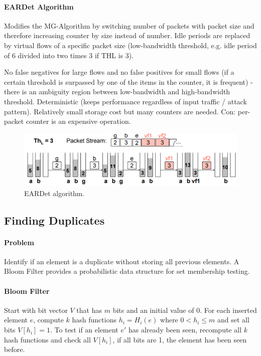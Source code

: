\paragraph{EARDet Algorithm}
Modifies the MG-Algorithm by switching number of packets with packet size and therefore increasing counter by size instead of number. Idle periods are replaced by virtual flows of a specific packet size (low-bandwidth threshold, e.g. idle period of 6 divided into two times 3 if THL is 3).

No false negatives for large flows and no false positives for small flows (if a certain threshold is surpassed by one of the items in the counter, it is frequent) - there is an ambiguity region between low-bandwidth and high-bandwidth threshold. Deterministic (keeps performance regardless of input traffic / attack pattern). Relatively small storage cost but many counters are needed. Con: per-packet counter is an expensive operation.

\begin{figure}[h]
	\centering
	\includegraphics[scale=0.8]{images/917-eardet.PNG}
	\caption{EARDet algorithm.}
	\label{fig:eardet}
\end{figure}


\subsection{Finding Duplicates}

\paragraph{Problem}
Identify if an element is a duplicate without storing all previous elements. A Bloom Filter provides a probabilistic data structure for set membership testing.

\paragraph{Bloom Filter}
Start with bit vector $V$ that has $m$ bits and an initial value of 0. For each inserted element $e$, compute $k$ hash functions $h_i = H_i(e)$ where $0 < h_i \leq m$ and set all bits $V[h_i] = 1$. To test if an element $e'$ has already been seen, recompute all $k$ hash functions and check all $V[h_i]$, if all bits are 1, the element has been seen before.

